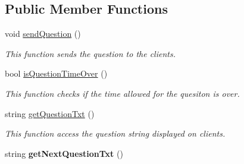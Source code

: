\subsection*{Public Member Functions}
\begin{DoxyCompactItemize}
\item 
void \hyperlink{class_question_manager_ae8d76463fb5637cc18a61a7f7f431e6e}{send\-Question} ()
\begin{DoxyCompactList}\small\item\em This function sends the question to the clients.\end{DoxyCompactList}\item 
bool \hyperlink{class_question_manager_ade5600a5b8885321c3dd6b03cfa2baab}{is\-Question\-Time\-Over} ()
\begin{DoxyCompactList}\small\item\em This function checks if the time allowed for the quesiton is over.\end{DoxyCompactList}\item 
string \hyperlink{class_question_manager_a5ebb18be24aecd9db9bc2434c2e888d8}{get\-Question\-Txt} ()
\begin{DoxyCompactList}\small\item\em This function access the question string displayed on clients.\end{DoxyCompactList}\item 
\hypertarget{class_question_manager_ada8a1aaea794720a6002c3361cbb13d2}{string {\bfseries get\-Next\-Question\-Txt} ()}\label{class_question_manager_ada8a1aaea794720a6002c3361cbb13d2}


\end{DoxyCompactItemize}

